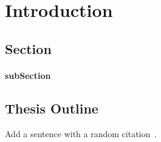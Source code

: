 \chapter{Introduction}
\label{chapter:introduction}
\section{Section}
\subsubsection{subSection}
\section{Thesis Outline} %

Add a sentence with a random citation~\cite{AER-Caltech-Memo}.